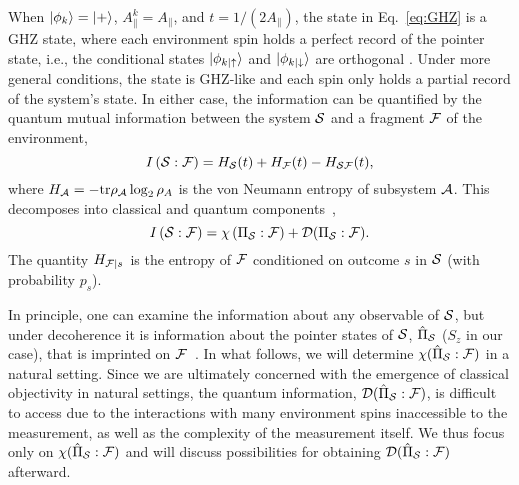 \documentclass[aps,prl,floatfix,twocolumn,footinbib,superscriptaddress]{revtex4-1}
\begin{document}
When $\ket{\phi_k} = \ket{+}$, $A^k_\parallel=A_\parallel$, and $t=1/(2A_\parallel)$, the state in Eq.~\eqref{eq:GHZ} is a GHZ state, where each environment spin holds a perfect record of the pointer state, i.e., the conditional states $\ket{\phi_{k|\up}}$ and $\ket{\phi_{k|\down}}$ are orthogonal . Under more general conditions, the state is GHZ-like and each spin only holds a partial record of the system's state. In either case, the information can be quantified by the quantum mutual information between the system $\S$ and a fragment $\F$ of the environment, 
\begin{equation} \label{eq:MI}
\MI = \ES + \EF - \ESF ,
\end{equation}
where $H_\A=-\tr \rho_\A \log_2 \rho_A$ is the von Neumann entropy of subsystem $\A$. This decomposes into classical and quantum components~\cite{Zwolak13-1}, 
\begin{equation} \label{eq:QC}
\MI = \Hol + \QD .
\end{equation}
The quantity $\CEF$ is the entropy of $\F$ conditioned on outcome $s$ in $\S$ (with probability $p_s$). 

In principle, one can examine the information about any observable of $\S$, but under decoherence it is information about the pointer states of $\S$, $\PO$ ($S_z$ in our case), that is imprinted on $\F$~\cite{Ollivier04-1,Zwolak13-1}. In what follows, we will determine $\HolpIL$ in a natural setting. Since we are ultimately concerned with the emergence of classical objectivity in natural settings, the quantum information, $\QDpIL$, is difficult to access due to the interactions with many environment spins inaccessible to the measurement, as well as the complexity of the measurement itself. We thus focus only on $\HolpIL$ and will discuss possibilities for obtaining $\QDpIL$ afterward.
\end{document}
